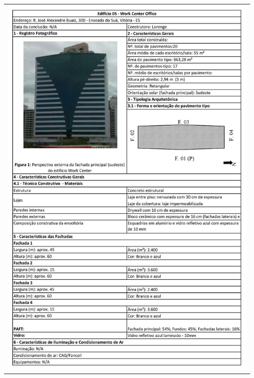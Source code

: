 \begin{table}[H]
    \centering
    \begin{tabular}{l}
        \includegraphics[width=\textwidth]{figures/appendices/edificio05.jpg}
    \end{tabular}
\end{table}
\pagebreak
